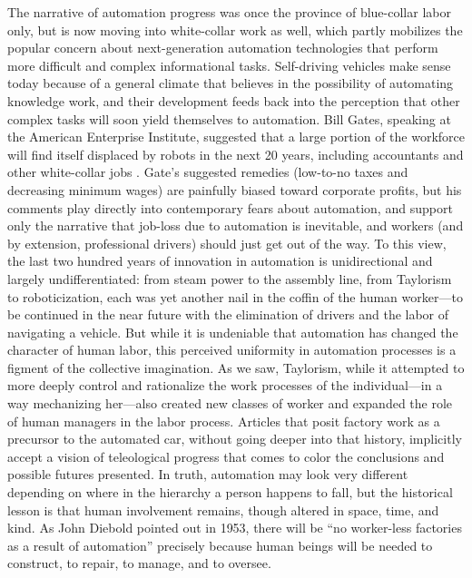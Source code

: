The narrative of automation progress was once the province of
blue-collar labor only, but is now moving into white-collar work as
well, which partly mobilizes the popular concern about next-generation
automation technologies that perform more difficult and complex
informational tasks. Self-driving vehicles make sense today because of
a general climate that believes in the possibility of automating
knowledge work, and their development feeds back into the perception
that other complex tasks will soon yield themselves to automation. Bill
Gates, speaking at the American Enterprise Institute,
suggested that a large portion of the workforce will find itself
displaced by robots in the next 20 years, including accountants and
other white-collar
jobs \cite{gatesRobots}.
Gate's suggested remedies (low-to-no taxes and decreasing minimum
wages) are painfully biased toward corporate profits, but his comments play directly into
contemporary fears about automation, and support only the
narrative that job-loss due to automation is inevitable, and workers
(and by extension, professional drivers)
should just get out of the way. To this view, the last two hundred
years of innovation in automation is unidirectional and largely
undifferentiated:  from steam power to the assembly line, from
Taylorism to roboticization, each was yet another nail in the coffin
of the human worker---to be continued in the near future with the
elimination of drivers and the labor of navigating a vehicle. But
while it is undeniable that automation has changed the
character of human labor, this perceived uniformity in automation
processes is a figment of the collective imagination. As we saw,
Taylorism, while it attempted to more deeply control and rationalize
the work processes of the individual---in a way mechanizing her---also
created new classes of worker and expanded the role of human managers
in the labor process. Articles that posit factory work as a precursor to the automated
car, without going deeper into that history, implicitly accept a
vision of teleological progress that comes to color the conclusions
and possible futures presented. In truth, automation may look very
different depending on where in the hierarchy 
a person happens to fall, but the historical lesson is that human
involvement remains, though altered in space, time, and kind. As John
Diebold pointed out in 1953, there will be ``no worker-less
factories as a result of automation'' \cite[p. 63-64]{dieboldNew}
precisely because human beings will be needed to construct, to repair,
to manage, and to oversee.

